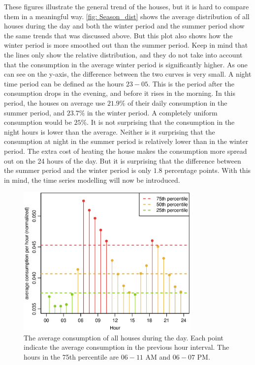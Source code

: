 \noindent These figures illustrate the general trend of the houses, but it is hard to compare them in a meaningful way. \cref{fig: Season_dist} shows the average distribution of all houses during the day and both the winter period and the summer period show the same trends that was discussed above. But this plot also shows how the winter period is more smoothed out than the summer period. Keep in mind that the lines only show the relative distribution, and they do not take into account that the consumption in the average winter period is significantly higher. As one can see on the y-axis, the difference between the two curves is very small. A night time period can be defined as the hours $23-05$. This is the period after the consumption drops in the evening, and before it rises in the morning. In this period, the houses on average use $21.9\%$ of their daily consumption in the summer period, and $23.7\%$ in the winter period. A completely uniform consumption would be $25\%$. It is not surprising that the consumption in the night hours is lower than the average. Neither is it surprising that the consumption at night in the summer period is relatively lower than in the winter period. The extra cost of heating the house makes the consumption more spread out on the 24 hours of the day. But it is surprising that the difference between the summer period and the winter period is only $1.8$ percentage points. With this in mind, the time series modelling will now be introduced.
\begin{figure}[ht]
    \centering
    \includegraphics[width=0.8\textwidth]{../../../figures/HourDistribution.eps}
    \caption{The average consumption of all houses during the day. Each point indicate the average consumption in the previous hour interval. The hours in the 75th percentile are $06-11$ AM and $06-07$ PM.}
    \label{fig:HourDistribution}
\end{figure}

